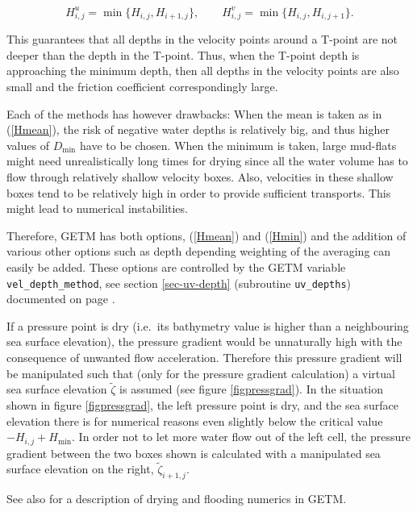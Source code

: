 \begin{equation}\label{Hmin}
H^u_{i,j}= \min\{H_{i,j},H_{i+1,j}\},
\qquad
H^v_{i,j}= \min\{H_{i,j},H_{i,j+1}\}.
\end{equation}

This guarantees that all depths in the velocity points around a T-point are not
deeper than the depth in the T-point. 
Thus, when the T-point depth is approaching
the minimum depth, then all depths in the velocity 
points are also small and the
friction coefficient correspondingly large. 

Each of the methods has however drawbacks: When the mean is taken as in
(\ref{Hmean}), the risk of negative water depths is relatively big, and thus
higher values of $D_{\min}$ have to be chosen. When the minimum is taken, 
large mud-flats might need unrealistically long times for drying since all
the water volume has to flow through relatively shallow velocity boxes.
Also, velocities in these shallow boxes tend to be relatively high in order to
provide sufficient transports. This might lead to numerical instabilities. 

Therefore, GETM has both options, (\ref{Hmean}) and (\ref{Hmin}) 
and the addition of various other options such
as depth depending weighting of the averaging can easily be added.  
These options are controlled by the GETM variable {\tt vel\_depth\_method},
see section \ref{sec-uv-depth} (subroutine {\tt uv\_depths}) documented
on page \pageref{sec-uv-depth}.

If a pressure point is dry (i.e.\ its bathymetry value is higher than
a neighbouring sea surface elevation),
the pressure gradient would be unnaturally high with the consequence
of unwanted flow acceleration. Therefore this pressure gradient will
be manipulated such that (only for the pressure gradient calculation)
a virtual sea surface elevation $\tilde \zeta$ is assumed
(see figure \ref{figpressgrad}). In the situation shown in figure
\ref{figpressgrad}, the left pressure point is dry, and the sea surface
elevation
there is for numerical reasons even slightly below the critical value
$-H_{i,j}+H_{\min}$. In order not to let more water flow out of the left cell,
the pressure gradient between the two boxes shown is calculated with a
manipulated sea surface elevation on the right, $\tilde \zeta_{i+1,j}$.

See also \cite{BURCHARDea03a} for a description of drying and flooding 
numerics in GETM.

